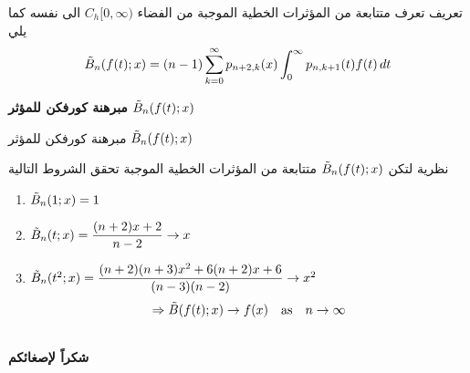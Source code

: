 \begin{frame}
	\begin{exampleblock}{تعريف}
		تعرف متتابعة من المؤثرات الخطية الموجبة من الفضاء $C_h[0, \infty)$ الى نفسه كما يلي
		\[
		\tilde{B}_n(f(t); x) = (n-1)\sum_{k=0}^{\infty} p_{n+2, k}(x) \int_{0}^{\infty} p_{n, k+1}(t) f(t) \, dt
		\]
	\end{exampleblock}
\end{frame}

\begin{frame}
	\begin{center}
		\Huge\textbf{مبرهنة كورفكن للمؤثر $\tilde{B}_n(f(t); x)$}
	\end{center}
\end{frame}

\begin{frame}{مبرهنة كورفكن للمؤثر $\tilde{B}_n(f(t); x)$}
	\begin{exampleblock}{نظرية}
		لتكن $\tilde{B}_n(f(t); x)$ متتابعة من المؤثرات الخطية الموجبة  تحقق الشروط التالية
		\begin{english}
			\begin{enumerate}
				\item $\tilde{B}_n(1; x) = 1$
				\item $\tilde{B}_n(t; x) = \dfrac{(n+2)x+2}{n-2}\to x$
				\item $\tilde{B}_n(t^2; x) = \dfrac{(n+2)(n+3)x^2 + 6(n+2)x + 6}{(n-3)(n-2)}\to x^2$
				\[
				\Rightarrow \tilde{B}(f(t); x) \to f(x)\quad \text{as}\quad n \to \infty
				\]
			\end{enumerate}
		\end{english}
	\end{exampleblock}
\end{frame}

\begin{frame}
	\begin{center}
		\Huge
		\textbf{}\\
		\textbf{شكراً لإصغائكم}
	\end{center}
\end{frame}
